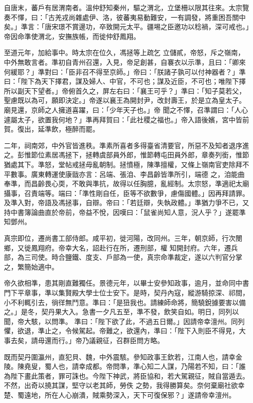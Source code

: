\begin{pinyinscope}
 自唐末，蕃戶有居渭南者。溫仲舒知秦州，驅之渭北，立堡柵以限其往來。太宗覽奏不懌，曰：「古羌戎尚雜處伊、洛，彼蕃夷易動難安，一有調發，將重困吾關中矣。」準言：「唐宋璟不賞邊功，卒致開元太平。疆埸之臣邀功以稔禍，深可戒也。」帝因命準使渭北，安撫族帳，而徙仲舒鳳翔。



 至道元年，加給事中。時太宗在位久，馮拯等上疏乞
 立儲貳，帝怒，斥之嶺南，中外無敢言者。準初自青州召還，入見，帝足創甚，自褰衣以示準，且曰：「卿來何緩耶？」準對曰：「臣非召不得至京師。」帝曰：「朕諸子孰可以付神器者？」準曰：「陛下為天下擇君，謀及婦人、中官，不可也；謀及近臣，不可也；唯陛下擇所以副天下望者。」帝俯首久之，屏左右曰：「襄王可乎？」準曰：「知子莫若父，聖慮既以為可，願即決定。」帝遂以襄王為開封尹，改封壽王，於是立為皇太子。廟見還，京師之人擁道喜躍，曰：「少年天子也。」帝
 聞之不懌，召準謂曰：「人心遽屬太子，欲置我何地？」準再拜賀曰：「此社稷之福也。」帝入語後嬪，宮中皆前賀。復出，延準飲，極醉而罷。



 二年，祠南郊，中外官皆進秩。準素所喜者多得臺省清要官，所惡不及知者退序進之。彭惟節位素居馮拯下，拯轉虞部員外郎，惟節轉屯田員外郎，章奏列銜，惟節猶處其下。準怒，堂帖戒拯毋亂朝制。拯憤極，陳準擅權，又條上嶺南官吏除拜不平數事。廣東轉運使康戩亦言：呂端、張洎、李昌齡皆準所引，端德
 之，洎能曲奉準，而昌齡畏心耎，不敢與準抗，故得以任胸臆，亂經制。太宗怒，準適祀太廟攝事，召責端等。端曰：「準性剛自任，臣等不欲數爭，慮傷國體。」因再拜請罪。及準入對，帝語及馮拯事，自辯。帝曰：「若廷辯，失執政體。」準猶力爭不已，又持中書簿論曲直於帝前，帝益不悅，因嘆曰：「鼠雀尚知人意，況人乎？」遂罷準知鄧州。



 真宗即位，遷尚書工部侍郎。咸平初，徙河陽，改同州。三年，朝京師，行次閿鄉，又徙鳳翔府。帝幸大名，詔赴行在所，遷刑部，權
 知開封府。六年，遷兵部，為三司使。時合鹽鐵、度支、戶部為一使，真宗命準裁定，遂以六判官分掌之，繁簡始適中。



 帝久欲相準，患其剛直難獨任。景德元年，以畢士安參知政事，逾月，並命同中書門下平章事，準以集賢殿大學士位士安下。是時，契丹內寇，縱游騎掠深、祁間，小不利輒引去，徜徉無鬥意。準曰：「是狃我也。請練師命將，簡驍銳據要害以備之。」是冬，契丹果大入。急書一夕凡五至，準不發，飲笑自如。明日，同列以聞，帝大駭，以問準。
 準曰：「陛下欲了此，不過五日爾。」因請帝幸澶州。同列懼，欲退，準止之，令候駕起。帝難之，欲還內，準曰：「陛下入則臣不得見，大事去矣，請毋還而行。」帝乃議親征，召群臣問方略。



 既而契丹圍瀛州，直犯貝、魏，中外震駭。參知政事王欽若，江南人也，請幸金陵。陳堯叟，蜀人也，請幸成都。帝問準，準心知二人謀，乃陽若不知，曰：「誰為陛下畫此策者，罪可誅也。今陛下神武，將臣協和，若大駕親征，賊自當遁去。不然，出奇以撓其謀，堅守以老其師，勞佚
 之勢，我得勝算矣。奈何棄廟社欲幸楚、蜀遠地，所在人心崩潰，賊乘勢深入，天下可復保邪？」遂請帝幸澶州。




\end{pinyinscope}

